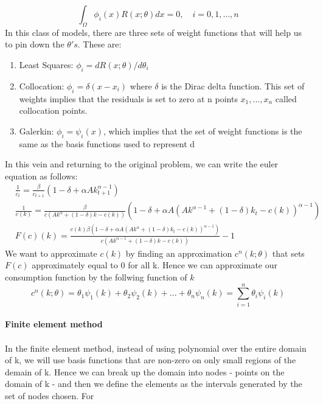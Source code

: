 \documentclass{article} %
\begin{document}
\begin{equation*}
  \int_{\Omega}\phi_i(x) R(x;\theta) dx = 0, \quad i=0,1,...,n
\end{equation*}
In this class of models, there are three sets of weight functions that will help us to pin down the $\theta's$. These are:
\begin{enumerate}
\item Least Squares: $\phi_i = dR(x;\theta)/d \theta_i$
\item Collocation: $\phi_i = \delta(x-x_i)$ where $\delta$ is the Dirac delta function. This set of weights implies that the residuals is set to zero at n points $x_1,...,x_n$ called collocation points. 
\item Galerkin: $\phi_i = \psi_i(x)$, which implies that the set of weight functions is the same as the basis functions used to represent d
\end{enumerate}
In this vein and returning to the original problem, we can write the euler equation as follows:
\begin{align}
  &  \frac{1}{c_t} = \frac{ \beta }{c_{t+1}}( 1-\delta + \alpha A  k_{t+1}^{\alpha - 1}) \nonumber \\
  &  \frac{1}{c(k)} = \frac{ \beta }{c(A  k^{\alpha} + (1-\delta)k - c(k))}(1-\delta + \alpha A  \left(A  k^{\alpha - 1} + (1-\delta)k_t - c(k)\right)^{\alpha - 1}) \nonumber \\
  &  F(c)(k) = \frac{c(k) \beta \left(1-\delta + \alpha A  \left(A  k^{\alpha} + (1-\delta)k_t - c(k)\right)^{\alpha - 1}\right) }{c(A  k^{\alpha - 1} + (1-\delta)k - c(k))}-1 \label{eq1}
\end{align}
We want to approximate $c(k)$ by finding an approximation
$c^n(k;\theta)$ that sets $F(c)$ approximately equal to 0 for all
k. Hence we can approximate our consumption function by the follwing
function of $k$
\begin{equation*}
c^n(k;\theta) = \theta_1 \psi_1(k) + \theta_2 \psi_2(k) + ... + \theta_n \psi_n(k) = \sum_{i=1}^n \theta_i \psi_i(k)  
\end{equation*}
\\
\textbf{Finite element method}
\\
\\
In the finite element method, instead of using polynomial over the
entire domain of k, we will use basis functions that are non-zero on
only small regions of the demain of k. Hence we can break up the
domain into nodes - points on the domain of k - and then we define the
elements as the intervals generated by the set of nodes chosen. For
\end{document}
